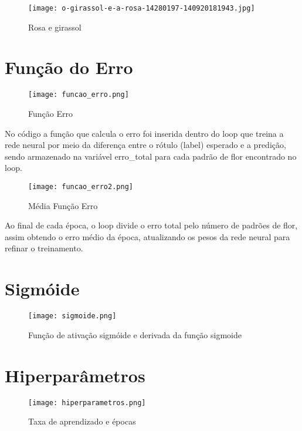 \documentclass[12pt]{article}
\begin{document}
\begin{figure}[H]
  \centering
  \texttt{[image: o-girassol-e-a-rosa-14280197-140920181943.jpg]}
  \caption{Rosa e girassol}
\end{figure}

\section{Função do Erro}

\begin{figure}[H]
  \centering
  \texttt{[image: funcao\_erro.png]}
  \caption{Função Erro}
\end{figure}

No código a função que calcula o erro foi inserida dentro do loop que treina a rede neural por meio da diferença entre o rótulo (label) esperado e a predição, sendo armazenado na variável erro\_total para cada padrão de flor encontrado no loop.

\begin{figure}[H]
  \centering
  \texttt{[image: funcao\_erro2.png]}
  \caption{Média Função Erro}
\end{figure}

Ao final de cada época, o loop divide o erro total pelo número de padrões de flor, assim obtendo o erro médio da época, atualizando os pesos da rede neural para refinar o treinamento.

\section{Sigmóide}
\begin{figure}[H]
  \centering
  \texttt{[image: sigmoide.png]}
  \caption{Função de ativação sigmóide e derivada da função sigmoide}
\end{figure}

\section{Hiperparâmetros}
\begin{figure}[H]
  \centering
  \texttt{[image: hiperparametros.png]}
  \caption{Taxa de aprendizado e épocas}
\end{figure}
\end{document}
